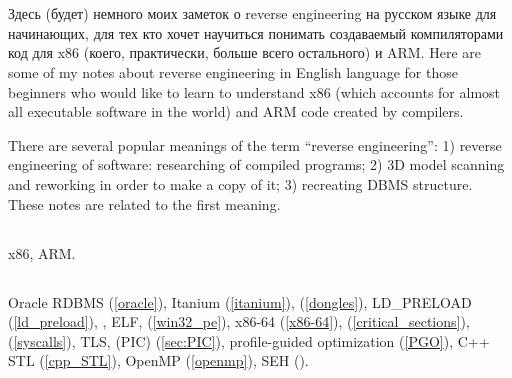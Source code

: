 \chapter{}

\IFRU
{Здесь (будет) немного моих заметок о \gls{reverse engineering} на русском языке для начинающих, 
для тех кто хочет научиться понимать создаваемый \CCpp компиляторами код для x86 (коего, 
практически, больше всего остального) и ARM.}
{Here are some of my notes about \gls{reverse engineering} in English language for 
those beginners who would like to learn to understand x86 (which accounts for almost 
all executable software in the world) and ARM code created by \CCpp compilers.}

{There are several popular meanings of the term ``\gls{reverse engineering}'': 
1) reverse engineering of software: researching of compiled programs;
2) 3D model scanning and reworking in order to make a copy of it;
3) recreating \ac{DBMS} structure.
These notes are related to the first meaning.}

\section{}

x86, ARM.

\section{}

Oracle RDBMS (\ref{oracle}),
Itanium (\ref{itanium}),
 (\ref{dongles}), 
LD\_PRELOAD (\ref{ld_preload}),
, 
\ac{ELF},
 (\ref{win32_pe}),
x86-64 (\ref{x86-64}),
 (\ref{critical_sections}),
 (\ref{syscalls}), 
\ac{TLS},
 (\ac{PIC}) (\ref{sec:PIC}), 
profile-guided optimization (\ref{PGO}),
C++ STL (\ref{cpp_STL}),
OpenMP (\ref{openmp}),
SEH (\label{sec:SEH}).

